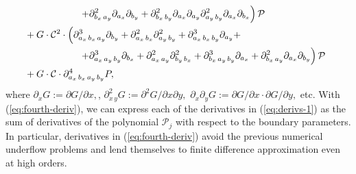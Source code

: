 \begin{align}
  \MoveEqLeft[10] \left. \qquad\qquad\qquad +\partial^2_{b_x\, a_y} \partial_{a_x} \partial_{b_y} + \partial^2_{b_x\, b_y} \partial_{a_x} \partial_{a_y} \partial^2_{a_y\, b_y} \partial_{a_x} \partial_{b_x} \right) \mathcal{P} &  \nonumber \\
  \MoveEqLeft[10] \,\, + G \cdot \mathcal{C}^2 \cdot \left( \partial^3_{a_x\,b_x\,a_y} \partial_{b_y} + \partial^2_{a_x\,b_x}\partial^2_{a_y\,b_y} + \partial^3_{a_x\,b_x\,b_y}\partial_{a_y}  + \right.& \nonumber \\
  \MoveEqLeft[10] \left. \qquad\qquad\qquad + \partial^3_{a_x\,a_y\,b_y} \partial_{b_x} + \partial^2_{a_x\,a_y} \partial^2_{b_y\,b_x} + \partial^3_{b_x\,a_y\,b_y}\partial_{a_x} + \partial^2_{b_x\,a_y}\partial_{a_x}\partial_{b_y} \right) \mathcal{P} & \nonumber \\
  \MoveEqLeft[10] \,\, + G \cdot \mathcal{C} \cdot \partial^4_{a_x\,b_x\,a_y\,b_y} P,& \label{eq:fourth-deriv}
\end{align}
where $\partial_{x}G := \partial G/\partial x,$,
$\partial^2_{x\,y}G := \partial^2 G/\partial x \partial y,$
$\partial_{x}\partial_{y}G := \partial G/\partial x \cdot \partial
G/\partial y,$ etc.  With (\ref{eq:fourth-deriv}), we can express each
of the derivatives in (\ref{eq:derivs-1}) as the sum of derivatives of
the polynomial $\mathcal{P}_j$ with respect to the boundary
parameters. In particular, derivatives in (\ref{eq:fourth-deriv})
avoid the previous numerical underflow problems and lend themselves to
finite difference approximation even at high orders.

